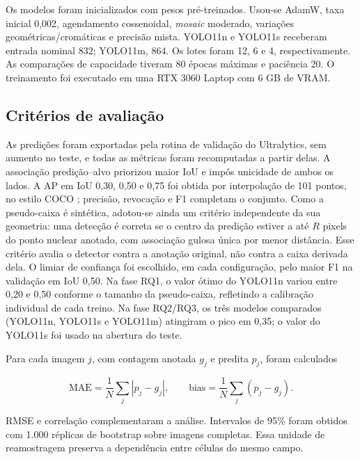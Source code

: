 \FloatBarrier
Os modelos foram inicializados com pesos pr\'e-treinados. Usou-se AdamW, taxa
inicial 0,002, agendamento cossenoidal, \textit{mosaic} moderado, varia\c{c}\~oes
geom\'etricas/crom\'aticas e precis\~ao mista. YOLO11n e YOLO11s receberam entrada
nominal 832; YOLO11m, 864. Os lotes foram 12, 6 e 4, respectivamente. As
compara\c{c}\~oes de capacidade tiveram 80 \'epocas m\'aximas e paci\^encia 20. O
treinamento foi executado em uma RTX 3060 Laptop com 6 GB de VRAM.

\subsection{Crit\'erios de avalia\c{c}\~ao}

As predi\c{c}\~oes foram exportadas pela rotina de valida\c{c}\~ao do Ultralytics,
sem aumento no teste, e todas as m\'etricas foram recomputadas a partir delas. A
associa\c{c}\~ao predi\c{c}\~ao--alvo priorizou maior IoU e imp\^os unicidade de
ambos os lados. A AP em IoU 0,30, 0,50 e 0,75 foi obtida por interpola\c{c}\~ao de
101 pontos, no estilo COCO \cite{lin2014coco}; precis\~ao, revoca\c{c}\~ao e F1
completam o conjunto. Como a pseudo-caixa \'e sint\'etica, adotou-se ainda um
crit\'erio independente da sua geometria: uma detec\c{c}\~ao \'e correta se o centro
da predi\c{c}\~ao estiver a at\'e $R$ pixels do ponto nuclear anotado, com
associa\c{c}\~ao gulosa \'unica por menor dist\^ancia. Esse crit\'erio avalia o
detector contra a anota\c{c}\~ao original, n\~ao contra a caixa derivada dela. O limiar de confian\c{c}a foi escolhido, em cada configura\c{c}\~ao, pelo maior
F1 na valida\c{c}\~ao em IoU 0,50. Na fase RQ1, o valor \'otimo do YOLO11n
variou entre 0,20 e 0,50 conforme o tamanho da pseudo-caixa, refletindo a
calibra\c{c}\~ao individual de cada treino. Na fase RQ2/RQ3, os tr\^es modelos
comparados (YOLO11n, YOLO11s e YOLO11m) atingiram o pico em 0,35; o valor do
YOLO11s foi usado na abertura do teste.

Para cada imagem $j$, com contagem anotada $g_j$ e predita $p_j$, foram
calculados

\begin{equation}
\mathrm{MAE}=\frac{1}{N}\sum_j|p_j-g_j|,\qquad
\mathrm{bias}=\frac{1}{N}\sum_j(p_j-g_j).
\end{equation}

RMSE e correla\c{c}\~ao complementaram a an\'alise. Intervalos de 95\% foram
obtidos com 1.000 r\'eplicas de bootstrap sobre imagens completas. Essa unidade
de reamostragem preserva a depend\^encia entre c\'elulas do mesmo campo.

